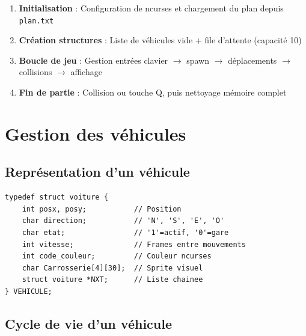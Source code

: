 \documentclass[11pt,a4paper]{article}
\newcommand{\code}[1]{\texttt{\textcolor{accent}{#1}}}
\begin{document}
\begin{enumerate}[label=\textcolor{primary}{\arabic*.}, leftmargin=2cm]
    \item \textbf{Initialisation} : Configuration de ncurses et chargement du plan depuis \code{plan.txt}
    \item \textbf{Création structures} : Liste de véhicules vide + file d'attente (capacité 10)
    \item \textbf{Boucle de jeu} : Gestion entrées clavier $\rightarrow$ spawn $\rightarrow$ déplacements $\rightarrow$ collisions $\rightarrow$ affichage
    \item \textbf{Fin de partie} : Collision ou touche Q, puis nettoyage mémoire complet
\end{enumerate}

\section{Gestion des véhicules}

\subsection{Représentation d'un véhicule}

\begin{codebox}
\begin{lstlisting}
typedef struct voiture {
    int posx, posy;           // Position
    char direction;           // 'N', 'S', 'E', 'O'
    char etat;                // '1'=actif, '0'=gare
    int vitesse;              // Frames entre mouvements
    int code_couleur;         // Couleur ncurses
    char Carrosserie[4][30];  // Sprite visuel
    struct voiture *NXT;      // Liste chainee
} VEHICULE;
\end{lstlisting}
\end{codebox}

\subsection{Cycle de vie d'un véhicule}
\end{document}

